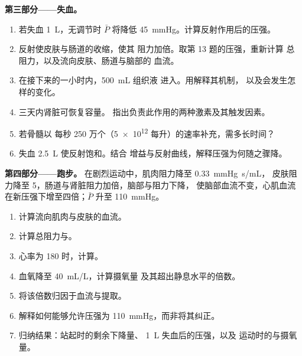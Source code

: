 \begin{problem}
\medskip
\noindent\textbf{第三部分——失血。}
\begin{enumerate}[resume]
  \item 若失血 \qty{1}{L}，无调节时 $\bar P$ 将降低
        \qty{45}{mmHg}。计算反射作用后的压强。
  \item 反射使皮肤与肠道的收缩，使其
        阻力加倍。取第 13 题的压强，重新计算
        总阻力，以及流向皮肤、肠道与脑部的
        血流。
  \item 在接下来的一小时内，\qty{500}{mL} 组织液
        进入。用解释其机制，
        以及会发生怎样的变化。
  \item 三天内肾脏可恢复容量。
        指出负责此作用的两种激素及其触发因素。
  \item 若骨髓以
        每秒 250 万个（\num{5e12} 每升）的速率补充，需多长时间？
  \item 失血 \qty{2.5}{L} 使反射饱和。结合
        增益与反射曲线，解释压强为何随之骤降。
\end{enumerate}

\medskip
\noindent\textbf{第四部分——跑步。}
在剧烈运动中，肌肉阻力降至 \qty{0.33}{mmHg.s/mL}，
皮肤阻力降至 5，肠道与肾脏阻力加倍，脑部与阻力下降，
使脑部血流不变，心肌血流
在新压强下增至四倍；$\bar P$ 升至 \qty{110}{mmHg}。
\begin{enumerate}[resume]
  \item 计算流向肌肉与皮肤的血流。
  \item 计算总阻力与。
  \item 心率为 180 时，计算。
  \item {}血氧降至 \qty{40}{mL/L}，计算摄氧量
        及其超出静息水平的倍数。
  \item 将该倍数归因于血流与提取。
  \item 解释如何能够允许压强为
        \qty{110}{mmHg}，而非将其纠正。
  \item 归纳结果：站起时的剩余下降量、
        \qty{1}{L} 失血后的压强，以及
        运动时的与摄氧量。
\end{enumerate}
\end{problem}
